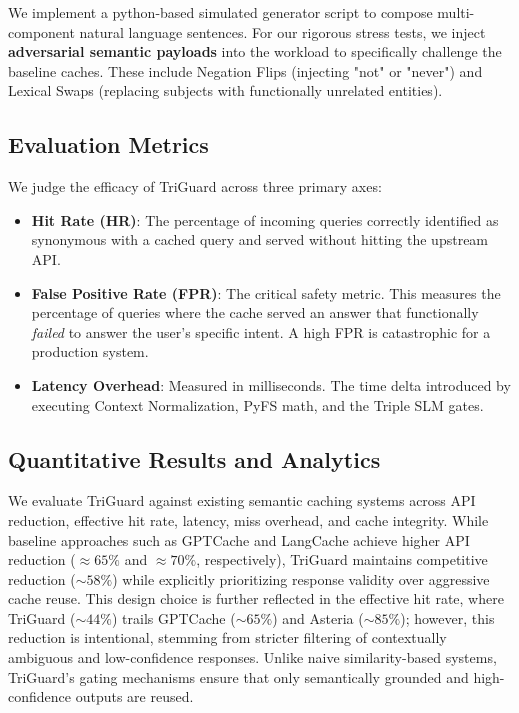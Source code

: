\documentclass[sigconf]{acmart}
\begin{document}
We implement a python-based simulated generator script to compose multi-component natural language sentences. For our rigorous stress tests, we inject \textbf{adversarial semantic payloads} into the workload to specifically challenge the baseline caches. These include Negation Flips (injecting "not" or "never") and Lexical Swaps (replacing subjects with functionally unrelated entities).

\subsection{Evaluation Metrics}
We judge the efficacy of TriGuard across three primary axes:
\begin{itemize}
    \item \textbf{Hit Rate (HR)}: The percentage of incoming queries correctly identified as synonymous with a cached query and served without hitting the upstream API.
    \item \textbf{False Positive Rate (FPR)}: The critical safety metric. This measures the percentage of queries where the cache served an answer that functionally \textit{failed} to answer the user's specific intent. A high FPR is catastrophic for a production system.
    \item \textbf{Latency Overhead}: Measured in milliseconds. The time delta introduced by executing Context Normalization, PyFS math, and the Triple SLM gates.
\end{itemize}

\subsection{Quantitative Results and Analytics}

We evaluate TriGuard against existing semantic caching systems across API reduction, effective hit rate, latency, miss overhead, and cache integrity. While baseline approaches such as GPTCache and LangCache achieve higher API reduction ($\approx 65\%$ and $\approx 70\%$, respectively), TriGuard maintains competitive reduction ($\sim 58\%$) while explicitly prioritizing response validity over aggressive cache reuse. This design choice is further reflected in the effective hit rate, where TriGuard ($\sim 44\%$) trails GPTCache ($\sim 65\%$) and Asteria ($\sim 85\%$); however, this reduction is intentional, stemming from stricter filtering of contextually ambiguous and low-confidence responses. Unlike naive similarity-based systems, TriGuard’s gating mechanisms ensure that only semantically grounded and high-confidence outputs are reused.
\end{document}
